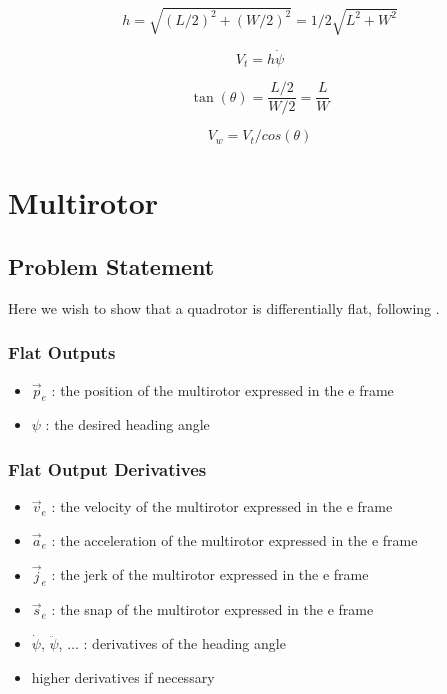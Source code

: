 \documentclass[10pt]{book}
\begin{document}
$$h = \sqrt{(L/2)^2 + (W/2)^2} = 1/2 \sqrt{L^2 + W^2}$$

$$V_t = h \dot{\psi}$$

$$\tan(\theta) = \frac{L/2}{W/2} = \frac{L}{W}$$

$$V_w = V_t / cos(\theta)$$

\clearpage
\section{Multirotor}


\subsection{Problem Statement}

Here we wish to show that a quadrotor is differentially flat, following \cite{mellinger2012}.

\subsubsection*{Flat Outputs}
\begin{itemize}
    \item $\vec{p}_e$ : the position of the multirotor expressed in the e frame
    \item $\psi$ : the desired heading angle

\end{itemize}

\subsubsection*{Flat Output Derivatives}
\begin{itemize}
    \item $\vec{v}_e$ : the velocity of the multirotor expressed in the e frame
    \item $\vec{a}_e$ : the acceleration of the multirotor expressed in the e frame
    \item $\vec{j}_e$ : the jerk of the multirotor expressed in the e frame
    \item $\vec{s}_e$ : the snap of the multirotor expressed in the e frame
    \item $\dot{\psi}$, $\ddot{\psi}$, $\ldots{}$ : derivatives of the heading angle
    \item higher derivatives if necessary
\end{itemize}
\end{document}
